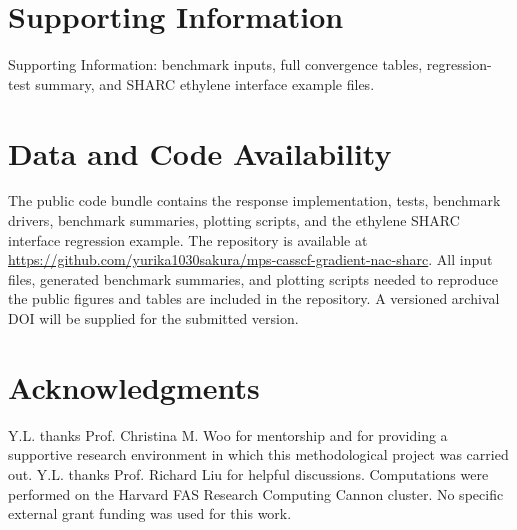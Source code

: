 \documentclass[journal=jctcce,manuscript=article]{achemso}
\begin{document}
\section*{Supporting Information}

Supporting Information: benchmark inputs, full convergence tables,
regression-test summary, and SHARC ethylene interface example files.

\section*{Data and Code Availability}

The public code bundle contains the response implementation, tests, benchmark
drivers, benchmark summaries, plotting scripts, and the ethylene SHARC
interface regression example.  The repository is available at
\url{https://github.com/yurika1030sakura/mps-casscf-gradient-nac-sharc}.  All input files,
generated benchmark summaries, and plotting scripts needed to reproduce the
public figures and tables are included in the repository.  A versioned
archival DOI will be supplied for the submitted version.

\section*{Acknowledgments}

Y.L. thanks Prof. Christina M. Woo for mentorship and for providing a
supportive research environment in which this methodological project was
carried out.  Y.L. thanks Prof. Richard Liu for helpful discussions.
Computations were performed on the Harvard FAS Research Computing Cannon
cluster.  No specific external grant funding was used for this work.


\end{document}

